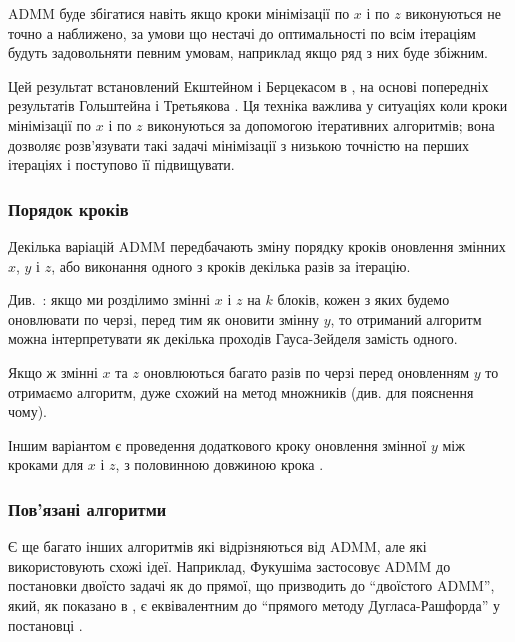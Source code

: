 ADMM буде збігатися навіть якщо кроки мінімізації по $x$ і по $z$ виконуються не точно а наближено, за умови що нестачі до оптимальності по всім ітераціям будуть задовольняти певним умовам, наприклад якщо ряд з них буде збіжним. \medskip

Цей результат встановлений Екштейном і Берцекасом в \cite{63}, на основі попередніх результатів Гольштейна і Третьякова \cite{89}. Ця техніка важлива у ситуаціях коли кроки мінімізації по $x$ і по $z$ виконуються за допомогою ітеративних алгоритмів; вона дозволяє розв'язувати такі задачі мінімізації з низькою точністю на перших ітераціях і поступово її підвищувати.

\subsubsection{Порядок кроків}

Декілька варіацій ADMM передбачають зміну порядку кроків оновлення змінних $x$, $y$ і $z$, або виконання одного з кроків декілька разів за ітерацію.

\begin{example}
    Див.~\cite{146}: якщо ми розділимо змінні $x$ і $z$ на $k$ блоків, кожен з яких будемо оновлювати по черзі, перед тим як оновити змінну $y$, то отриманий алгоритм можна інтерпретувати як декілька проходів Гауса-Зейделя замість одного.
\end{example}

\begin{example}
    Якщо ж змінні $x$ та $z$ оновлюються багато разів по черзі перед оновленням $y$ то отримаємо алгоритм, дуже схожий на метод множників (див. \cite[\S3.4.4]{17} для пояснення чому).
\end{example}

\begin{example}
    Іншим варіантом є проведення додаткового кроку оновлення змінної $y$ між кроками для $x$ і $z$, з половинною довжиною крока \cite{17}.
\end{example}

\subsubsection{Пов'язані алгоритми}

Є ще багато інших алгоритмів які відрізняються від ADMM, але які використовують схожі ідеї. Наприклад, Фукушіма \cite{80} застосовує ADMM до постановки двоїсто задачі як до прямої, що призводить до ``двоїстого ADMM'', який, як показано в \cite{65}, є еквівалентним до ``прямого методу Дугласа-Рашфорда'' у постановці \cite[\S3.5.6]{57}. \medskip

